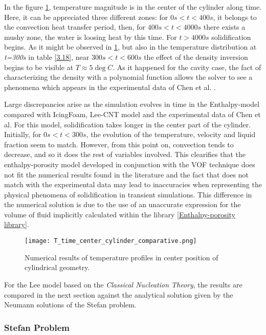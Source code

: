\noindent In the figure \ref{3.12fig}, temperature magnitude is in the center of the cylinder along time. Here, it can be appreciated three different zones: for $0s < t < 400s$, it belongs to the convection heat transfer period, then, for $400s < t < 4000s$ there exists a mushy zone, the water is loosing heat by this time. For $t > 4000s$ solidification begins. As it might be observed in \ref{3.12fig}, but also in the temperature distribution at \textit{t=300s} in table \ref{3.18}, near $300s < t < 600s$ the effect of the density inversion begins to be visible at $T \approx 5 \deg C$. As it happened for the cavity case, the fact of characterizing the density with a polynomial function allows the solver to see a phenomena which appears in the experimental data of Chen et al.  \cite{chen_lee_1998}.

\noindent Large discrepancies arise as the simulation evolves in time in the Enthalpy-model compared with IcingFoam, Lee-CNT model and the experimental data of Chen et al. For this model, solidification takes longer in the center part of the cylinder. Initially, for $0s < t < 300s$, the evolution of the temperature, velocity and liquid fraction seem to match. However, from this point on, convection tends to decrease, and so it does the rest of variables involved. This clearifies that the enthalpy-porosity model developed in conjunction with the VOF technique does not fit the numerical results found in the literature and the fact that does not match with the experimental data may lead to inaccuracies when representing the physical phenomena of solidification in transient simulations. This difference in the numerical solution is due to the use of an unaccurate expression for the volume of fluid implicitly calculated within the library \ref{Enthalpy-porosity library}.

\begin{figure}[t]
	\centering
	\texttt{[image: T\_time\_center\_cylinder\_comparative.png]}	
	\caption{Numerical results of temperature profiles in center position of cylindrical geometry.}
	\label{3.12fig}
\end{figure} 

\noindent For the Lee model based on the \textit{Classical Nucleation Theory}, the results are compared in the next section against the analytical solution given by the Neumann solutions of the Stefan problem.

\clearpage
\subsubsection{Stefan Problem}

